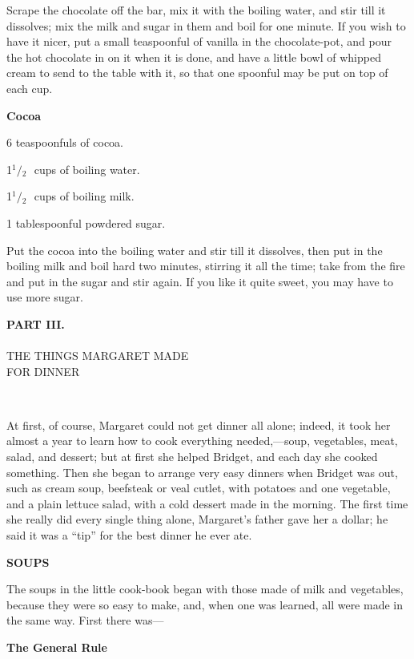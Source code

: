 \documentclass[11pt]{book}
\newcommand{\indpar}{\par\noindent\hspace*{\parindent}}
\newcommand{\ingredient}{\indpar}
\newcommand{\instruction}{\indpar}
\newcommand{\OneHalf}{\ensuremath{{}^1\!\!/\!{}_2\mbox{\ }}}
\newenvironment{RecipeTitle}{\medskip\begin{center}\large\bf }{\end{center}\smallskip}
\newenvironment{FoodTypeTitle}{\begin{center}\large\bf }{\end{center}}
\begin{document}
\instruction
  Scrape the chocolate off the bar, mix it with the
boiling water, and stir till it dissolves; mix the milk
and sugar in them and boil for one minute.  If you wish
to have it nicer, put a small teaspoonful of vanilla in
the chocolate-pot, and pour the hot chocolate in on it
when it is done, and have a little bowl of whipped cream
to send to the table with it, so that one spoonful may be
put on top of each cup.
\begin{RecipeTitle}
Cocoa\label{cocoa}
\end{RecipeTitle}
\ingredient  6 teaspoonfuls of cocoa.
\ingredient  1\OneHalf cups of boiling water.
\ingredient  1\OneHalf cups of boiling milk.
\ingredient  1 tablespoonful powdered sugar.
\instruction
  Put the cocoa into the boiling water and stir till it
dissolves, then put in the boiling milk and boil hard
two minutes, stirring it all the time; take from the fire
and put in the sugar and stir again.  If you like it quite
sweet, you may have to use more sugar.
\cleardoublepage
\thispagestyle{empty}
\vspace*{30ex}
\begin{center}
{\large \bf PART III.}\\
\ \\
THE THINGS MARGARET MADE\\
FOR DINNER\label{PART_III}
\end{center}
\newpage
\thispagestyle{empty}
\ 
\newpage
\thispagestyle{plain}
\vspace*{10ex}
\indpar
  At first, of course,  Margaret could not get dinner all alone;
indeed, it took her almost a year to learn how to cook everything
needed,---soup, vegetables, meat, salad, and dessert; but at
first she helped Bridget, and each day she cooked something.
Then she began to arrange very easy dinners when Bridget was out,
such as cream soup, beefsteak or veal cutlet, with potatoes and
one vegetable, and a plain lettuce salad, with a cold dessert
made in the morning.  The first time she really did every single
thing alone, Margaret's father gave her a dollar; he said it was
a ``tip'' for the best dinner he ever ate.
\medskip
\begin{FoodTypeTitle}
SOUPS\label{SOUPS}
\end{FoodTypeTitle}
\indpar
  The soups in the little cook-book began with those made of
milk and vegetables, because they were so easy to make, and,
when one was learned, all were made in the same way.  First
there was---\pagebreak[4]
\begin{RecipeTitle}
The General Rule\label{general_rule_cream_soup}
\end{RecipeTitle}
\end{document}
